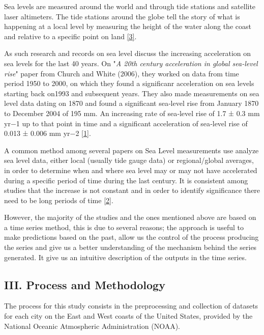 \documentclass[11pt]{article}
\begin{document}
Sea levels are measured around the world and through tide stations and
satellite laser altimeters. The tide stations around the globe tell the
story of what is happening at a local level by measuring the height of
the water along the coast and relative to a specific point on land
\href{https://oceanservice.noaa.gov/facts/sealevel.html}{{[}3{]}}.

As such research and records on sea level discuss the increasing
acceleration on sea levels for the last 40 years. On "\emph{A 20th
century acceleration in global sea-level rise}" paper from Church and
White (2006), they worked on data from time period 1950 to 2000, on
which they found a significanr acceleration on sea levels starting back
on1993 and subsequent years. They also made measurements on sea level
data dating on 1870 and found a significant sea‐level rise from January
1870 to December 2004 of 195 mm. An increasing rate of sea‐level rise of
1.7 ± 0.3 mm yr−1 up to that point in time and a significant
acceleration of sea‐level rise of 0.013 ± 0.006 mm yr−2
\href{https://agupubs.onlinelibrary.wiley.com/doi/full/10.1029/2005GL024826}{{[}1{]}}.

A common method among several papers on Sea Level measurements use
analyze sea level data, either local (usually tide gauge data) or
regional/global averages, in order to determine when and where sea level
may or may not have accelerated during a specific period of time during
the last century. It is consistent among studies that the increase is
not constant and in order to identify significance there need to be long
periods of time
\href{https://www.researchgate.net/publication/265467321_Time_and_tide_analysis_of_sea_level_time_series}{{[}2{]}}.

However, the majority of the studies and the ones mentioned above are
based on a time series method, this is due to several reasons; the
approach is useful to make predictions based on the past, allow us the
control of the process producing the series and give us a better
understanding of the mechanism behind the series generated. It give us
an intuitive description of the outputs in the time series.

    \subsection{III. Process and
Methodology}\label{iii.-process-and-methodology}

The process for this study consists in the preprocessing and collection
of datasets for each city on the East and West coasts of the United
States, provided by the National Oceanic Atmospheric Administration
(NOAA).
\end{document}
